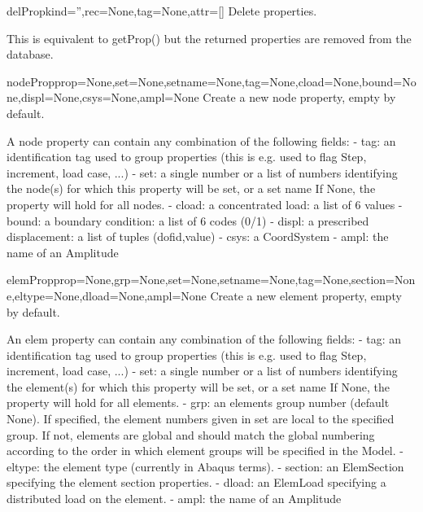 \begin{funcdesc}{delProp}{kind='',rec=None,tag=None,attr=[]}
Delete properties.

        This is equivalent to getProp() but the returned properties
        are removed from the database.
        
\end{funcdesc}

\begin{funcdesc}{nodeProp}{prop=None,set=None,setname=None,tag=None,cload=None,bound=None,displ=None,csys=None,ampl=None}
Create a new node property, empty by default.

        A node property can contain any combination of the following fields:
        - tag: an identification tag used to group properties (this is e.g.
               used to flag Step, increment, load case, ...)
        - set: a single number or a list of numbers identifying the node(s)
                for which this property will be set, or a set name
                If None, the property will hold for all nodes.
        - cload: a concentrated load: a list of 6 values
        - bound: a boundary condition: a list of 6 codes (0/1)
        - displ: a prescribed displacement: a list of tuples (dofid,value)
        - csys: a CoordSystem
        - ampl: the name of an Amplitude
        
\end{funcdesc}

\begin{funcdesc}{elemProp}{prop=None,grp=None,set=None,setname=None,tag=None,section=None,eltype=None,dload=None,ampl=None}
Create a new element property, empty by default.
        
        An elem property can contain any combination of the following fields:
        - tag: an identification tag used to group properties (this is e.g.
               used to flag Step, increment, load case, ...)
        - set: a single number or a list of numbers identifying the element(s)
                for which this property will be set, or a set name
                If None, the property will hold for all elements.
        - grp: an elements group number (default None). If specified, the
               element numbers given in set are local to the specified group.
               If not, elements are global and should match the global numbering
               according to the order in which element groups will be specified
               in the Model.
        - eltype: the element type (currently in Abaqus terms). 
        - section: an ElemSection specifying the element section properties.
        - dload: an ElemLoad specifying a distributed load on the element.
        - ampl: the name of an Amplitude
        
\end{funcdesc}

